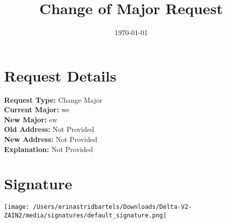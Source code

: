 \documentclass{article}
\begin{document}
\title{Change of Major Request}
\date{\today}

\maketitle



\section*{Request Details}
\textbf{Request Type:} Change Major \\
\textbf{Current Major:} we \\
\textbf{New Major:} ew \\
\textbf{Old Address:} Not Provided \\
\textbf{New Address:} Not Provided \\
\textbf{Explanation:} Not Provided

\section*{Signature}
\vspace{1cm}
\texttt{[image: /Users/erinastridbartels/Downloads/Delta-V2-ZAIN2/media/signatures/default\_signature.png]} %
\end{document}
